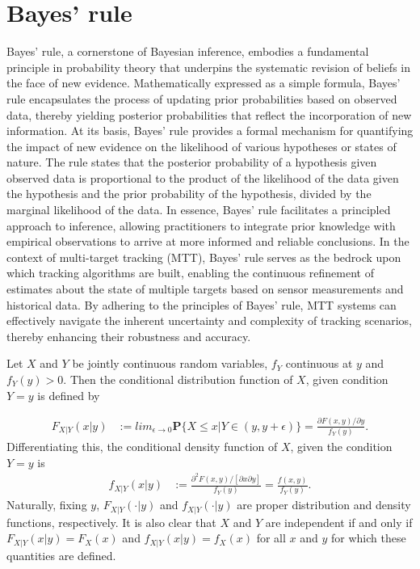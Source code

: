     \section{Bayes' rule}
Bayes' rule, a cornerstone of Bayesian inference, embodies a fundamental principle in probability theory that underpins the systematic revision of beliefs in the face of new evidence. Mathematically expressed as a simple formula, Bayes' rule encapsulates the process of updating prior probabilities based on observed data, thereby yielding posterior probabilities that reflect the incorporation of new information. At its basis, Bayes' rule provides a formal mechanism for quantifying the impact of new evidence on the likelihood of various hypotheses or states of nature. The rule states that the posterior probability of a hypothesis given observed data is proportional to the product of the likelihood of the data given the hypothesis and the prior probability of the hypothesis, divided by the marginal likelihood of the data. In essence, Bayes' rule facilitates a principled approach to inference, allowing practitioners to integrate prior knowledge with empirical observations to arrive at more informed and reliable conclusions. In the context of multi-target tracking (MTT), Bayes' rule serves as the bedrock upon which tracking algorithms are built, enabling the continuous refinement of estimates about the state of multiple targets based on sensor measurements and historical data. By adhering to the principles of Bayes' rule, MTT systems can effectively navigate the inherent uncertainty and complexity of tracking scenarios, thereby enhancing their robustness and accuracy. 
    \begin{definition}
    Let $X$ and $Y$ be jointly continuous random variables, $f_Y$ continuous at $y$ and $f_Y(y) > 0$. Then the conditional distribution function of $X$, given condition ${Y=y}$ is defined by
    \end{definition}
    \begin{align}
        F_{X|Y}(x|y) &:= lim_{\epsilon\to0} \textbf{P}\{X\leq x | Y \in (y, y + \epsilon)\} = \frac{\partial F(x,y) / \partial y}{f_Y(y)}.\label{eq:conditional_distribution}
    \end{align}
    Differentiating this, the conditional density function of $X$, given the condition ${Y = y}$ is
    \begin{align}
        f_{X|Y}(x|y) &:= \frac{\partial^2 F(x,y) / [\partial x \partial y]}{f_Y(y)} = \frac{f(x,y)}{f_Y(y)}. \label{eq:conditional_distribution2}
    \end{align}
    Naturally, fixing $y$, $F_{X|Y}(\cdot|y)$ and $f_{X|Y}(\cdot|y)$ are proper distribution and density functions, respectively. It is also clear that $X$ and $Y$ are independent if and only if $F_{X|Y}(x|y) = F_X(x)$ and $f_{X|Y}(x|y) = f_X(x)$ for all $x$ and $y$ for which these quantities are defined.

